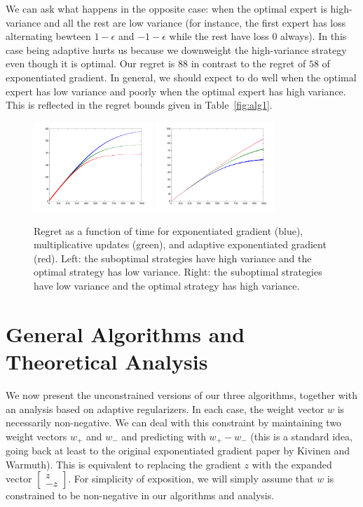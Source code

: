\documentclass[11pt]{article}
\begin{document}
We can ask what happens in the opposite case: when the optimal expert is high-variance and all 
the rest are low variance (for instance, the first expert has loss alternating bewteen $1-\epsilon$ 
and $-1-\epsilon$ while the rest have loss $0$ always). In this case being adaptive hurts us because 
we downweight the high-variance strategy even though it is optimal. Our regret is $88$ in contrast 
to the regret of $58$ of exponentiated gradient. In general, we should expect to do well when the optimal 
expert has low variance and poorly when the optimal expert has high variance. This is reflected 
in the regret bounds given in Table~\ref{fig:alg1}.

\begin{figure}
        \begin{center}
                \includegraphics[width=0.4\textwidth]{simple.pdf} \includegraphics[width=0.4\textwidth]{tricky.pdf}
        \end{center}
        \caption{Regret as a function of time for exponentiated gradient (blue), multiplicative updates (green), and adaptive exponentiated gradient (red). Left: 
        the suboptimal strategies have high variance and the optimal strategy has low variance. Right: the suboptimal strategies have low variance and the 
        optimal strategy has high variance.}
        \label{fig:simple}
\end{figure}

\section{General Algorithms and Theoretical Analysis}
We now present the unconstrained versions of our three algorithms, together 
with an analysis based on adaptive regularizers. In each case, the weight 
vector $w$ is necessarily non-negative. We can deal with this constraint by 
maintaining two weight vectors $w_+$ and $w_-$ and predicting with $w_+-w_-$ 
(this is a standard idea, going back at least to the original exponentiated 
gradient paper by Kivinen and Warmuth). This is equivalent to replacing the 
gradient $z$ with the expanded vector $\left[ \begin{array}{cc} z \\ -z \end{array} \right]$. 
For simplicity of exposition, we will simply assume that $w$ is constrained 
to be non-negative in our algorithms and analysis.
\end{document}
